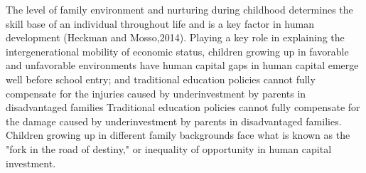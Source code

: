The level of family environment and nurturing during childhood determines the skill base of an individual throughout life and is a key factor in human development (Heckman and Mosso,2014). Playing a key role in explaining the intergenerational mobility of economic status, children growing up in favorable and unfavorable environments have human capital gaps in human capital emerge well before school entry; and traditional education policies cannot fully compensate for the injuries caused by underinvestment by parents in disadvantaged families Traditional education policies cannot fully compensate for the damage caused by underinvestment by parents in disadvantaged families. Children growing up in different family backgrounds face what is known as the "fork in the road of destiny," or inequality of opportunity in human capital investment.



